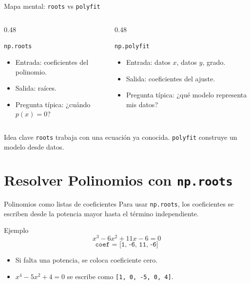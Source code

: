\documentclass[10pt]{beamer}
\begin{document}
\begin{frame}{Mapa mental: \texttt{roots} vs \texttt{polyfit}}
  \begin{columns}
    \begin{column}{0.48\textwidth}
      \begin{block}{\texttt{np.roots}}
        \begin{itemize}
          \item Entrada: coeficientes del polinomio.
          \item Salida: raíces.
          \item Pregunta típica: ¿cuándo \(p(x)=0\)?
        \end{itemize}
      \end{block}
    \end{column}
    \begin{column}{0.48\textwidth}
      \begin{block}{\texttt{np.polyfit}}
        \begin{itemize}
          \item Entrada: datos \(x\), datos \(y\), grado.
          \item Salida: coeficientes del ajuste.
          \item Pregunta típica: ¿qué modelo representa mis datos?
        \end{itemize}
      \end{block}
    \end{column}
  \end{columns}

  \vspace{0.4cm}
  \begin{alertblock}{Idea clave}
    \texttt{roots} trabaja con una ecuación ya conocida. \texttt{polyfit} construye un modelo desde datos.
  \end{alertblock}
\end{frame}

\section{Resolver Polinomios con \texttt{np.roots}}

\begin{frame}{Polinomios como listas de coeficientes}
  Para usar \texttt{np.roots}, los coeficientes se escriben desde la potencia mayor hasta el término independiente.

  \begin{block}{Ejemplo}
    \[
      x^3 - 6x^2 + 11x - 6 = 0
    \]
    \[
      \texttt{coef = [1, -6, 11, -6]}
    \]
  \end{block}

  \begin{itemize}
    \item Si falta una potencia, se coloca coeficiente cero.
    \item \(x^4 - 5x^2 + 4 = 0\) se escribe como \texttt{[1, 0, -5, 0, 4]}.
  \end{itemize}
\end{frame}
\end{document}
